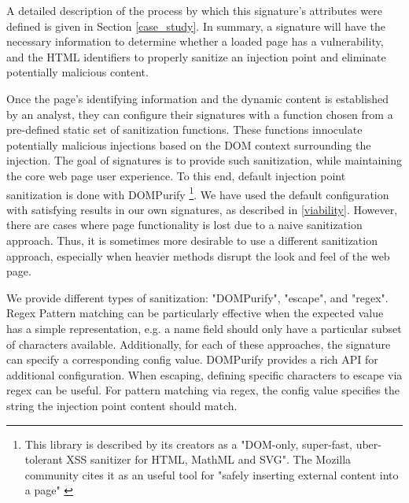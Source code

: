 A detailed description of the process by which this signature's attributes were defined is given in Section \ref{case_study}. In summary, a signature will have the necessary information to determine whether a loaded page has a vulnerability, and the HTML identifiers to properly sanitize an injection point and eliminate potentially malicious content.
  
Once the page's identifying information and the dynamic content is established by an analyst, they can configure their signatures with a function chosen from a pre-defined static set of sanitization functions. These functions innoculate potentially malicious injections based on the DOM context surrounding the injection. The goal of signatures is to provide such sanitization, while maintaining the core web page user experience. To this end, default injection point sanitization is done with DOMPurify \cite{10.1007/978-3-319-66399-9_7} \footnote{This library is described by its creators as a "DOM-only, super-fast, uber-tolerant XSS sanitizer for HTML, MathML and SVG". The Mozilla community cites it as an useful tool for "safely inserting external content into a page" \cite{safecontent}}. We have used the default configuration with satisfying results in our own signatures, as described in \autoref{viability}. However, there are cases where page functionality is lost due to a naive sanitization approach. Thus, it is sometimes more desirable to use a different sanitization approach, especially when heavier methods disrupt the look and feel of the web page.
 
We provide different types of sanitization: "DOMPurify", "escape", and "regex". Regex Pattern matching can be particularly effective when the expected value has a simple representation, e.g. a name field should only have a particular subset of characters available. Additionally, for each of these approaches, the signature can specify a corresponding config value. DOMPurify provides a rich API for additional configuration. When escaping, defining specific characters to escape via regex can be useful. For pattern matching via regex, the config value specifies the string the injection point content should match.
 
